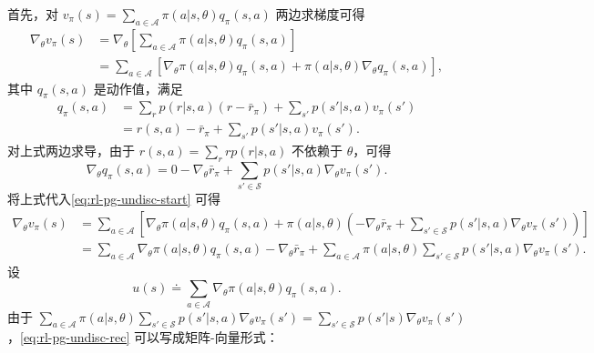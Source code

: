 \begin{note}
\label{box:rl-pg-9-6}
首先，对 $v_{\pi}(s) = \sum_{a\in \mathcal{A}}\pi(a|s,\theta)q_{\pi}(s,a)$ 两边求梯度可得
\begin{equation}
\begin{aligned}
\nabla_{\theta} v_{\pi}(s) &= \nabla_{\theta} \left[ \sum_{a \in \mathcal{A}} \pi(a|s,\theta) q_{\pi}(s,a) \right] \\
&= \sum_{a \in \mathcal{A}} \left[ \nabla_{\theta} \pi(a|s,\theta) q_{\pi}(s,a) + \pi(a|s,\theta) \nabla_{\theta} q_{\pi}(s,a) \right],
\end{aligned}
\label{eq:rl-pg-undisc-start}
\end{equation}
其中 $q_{\pi}(s,a)$ 是动作值，满足
\begin{equation}
\begin{aligned}
q_{\pi}(s,a) &= \sum_{r} p(r|s,a)(r - \bar{r}_{\pi}) + \sum_{s'} p(s'|s,a) v_{\pi}(s') \\
&= r(s,a) - \bar{r}_{\pi} + \sum_{s'} p(s'|s,a) v_{\pi}(s').
\end{aligned}
\end{equation}
对上式两边求导，由于 $r(s,a) = \sum_r r p(r|s,a)$ 不依赖于 $\theta$，可得
\begin{equation}
\nabla_{\theta} q_{\pi}(s,a) = 0 - \nabla_{\theta} \bar{r}_{\pi} + \sum_{s' \in \mathcal{S}} p(s'|s,a) \nabla_{\theta} v_{\pi}(s').
\end{equation}
将上式代入\cref{eq:rl-pg-undisc-start} 可得
\begin{equation}
\begin{aligned}
\nabla_{\theta} v_{\pi}(s) &= \sum_{a \in \mathcal{A}} \left[ \nabla_{\theta} \pi(a|s,\theta) q_{\pi}(s,a) + \pi(a|s,\theta) \left(- \nabla_{\theta} \bar{r}_{\pi} + \sum_{s' \in \mathcal{S}} p(s'|s,a) \nabla_{\theta} v_{\pi}(s')\right) \right] \\
&= \sum_{a \in \mathcal{A}} \nabla_{\theta} \pi(a|s,\theta) q_{\pi}(s,a) - \nabla_{\theta} \bar{r}_{\pi} + \sum_{a \in \mathcal{A}} \pi(a|s,\theta) \sum_{s' \in \mathcal{S}} p(s'|s,a) \nabla_{\theta} v_{\pi}(s').
\end{aligned}
\label{eq:rl-pg-undisc-rec}
\end{equation}
设
\begin{equation}
u(s) \doteq \sum_{a \in \mathcal{A}} \nabla_{\theta} \pi(a|s,\theta) q_{\pi}(s,a).
\end{equation}
由于 $\sum_{a\in \mathcal{A}}\pi(a|s,\theta)\sum_{s'\in \mathcal{S}}p(s'|s,a)\nabla_{\theta}v_{\pi}(s') = \sum_{s'\in \mathcal{S}}p(s'|s)\nabla_{\theta}v_{\pi}(s')$，\cref{eq:rl-pg-undisc-rec} 可以写成矩阵-向量形式：

\end{note}
